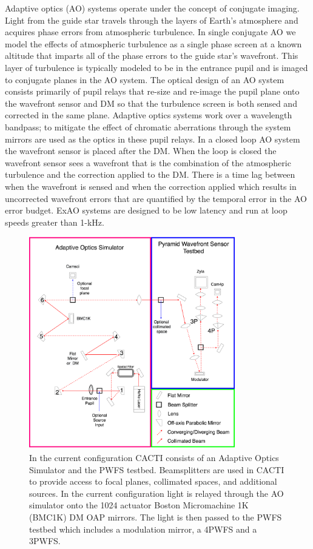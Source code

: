 \documentclass[12pt]{spieman}  %
\begin{document}
\begin{spacing}{2}
Adaptive optics (AO) systems operate under the concept of conjugate imaging. Light from the guide star travels through the layers of Earth's atmosphere and acquires phase errors from atmospheric turbulence. In single conjugate AO we model the effects of atmospheric turbulence as a single phase screen at a known altitude that imparts all of the phase errors to the guide star's wavefront. This layer of turbulence is typically modeled to be in the entrance pupil and is imaged to conjugate planes in the AO system. The optical design of an AO system consists primarily of pupil relays that re-size and re-image the pupil plane onto the wavefront sensor and DM so that the turbulence screen is both sensed and corrected in the same plane. Adaptive optics systems work over a wavelength bandpass; to mitigate the effect of chromatic aberrations through the system mirrors are used as the optics in these pupil relays. In a closed loop AO system the wavefront sensor is placed after the DM. When the loop is closed the wavefront sensor sees a wavefront that is the combination of the atmospheric turbulence and the correction applied to the DM. There is a time lag between when the wavefront is sensed and when the correction applied which results in uncorrected wavefront errors that are quantified by the temporal error in the AO error budget. ExAO systems are designed to be low latency and run at loop speeds greater than 1-kHz.

\begin{figure}
    \centering
    \includegraphics[width=0.8\textwidth]{CACTI.png}
    \caption{In the current configuration CACTI consists of an Adaptive Optics Simulator and the PWFS testbed. Beamsplitters are used in CACTI to provide access to focal planes, collimated spaces, and additional sources. In the current configuration light is relayed through the AO simulator onto the 1024 actuator Boston Micromachine 1K (BMC1K) DM OAP mirrors. The light is then passed to the PWFS testbed which includes a modulation mirror, a 4PWFS and a 3PWFS.}
    \label{fig:CACTI}
\end{figure}


\end{spacing}
\end{document}
